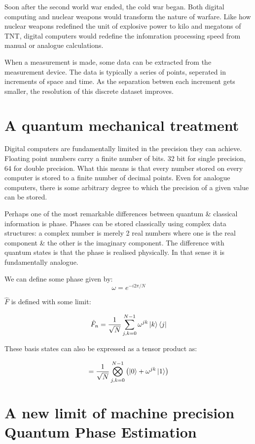 \documentclass{book}
\begin{document}
Soon after the second world war ended, the cold war began. Both digital computing and nuclear weapons would transform the nature of warfare. Like how nuclear weapons redefined the unit of explosive power to kilo and megatons of TNT, digital computers would redefine the infomration processing speed from manual or analogue calculations. 


When a measurement is made, some data can be extracted from the measurement device. The data is typically a series of points, seperated in increments of space and time. As the separation betwen each increment gets smaller, the resolution of this discrete dataset improves. 


\section{A quantum mechanical treatment}


Digital computers are fundamentally limited in the precision they can achieve. Floating point numbers carry a finite number of bits. 32 bit for single precision, 64 for double precision. What this means is that every number stored on every computer is stored to a finite number of decimal points. Even for analogue computers, there is some arbitrary degree to which the precision of a given value can be stored. 

Perhaps one of the most remarkable differences between quantum \& classical information is phase. Phases can be stored classically using complex data structures: a complex number is merely 2 real numbers where one is the real component \& the other is the imaginary component. The difference with quantum states is that the phase is realised physically. In that sense it is fundamentally analogue. 

We can define some phase given by:
$$ \omega = e^{-i2\pi /N} $$

$\hat{F}$ is defined with some limit:

$$\hat{F}_n =  \frac{1}{\sqrt{N}} \sum_{j,k = 0}^{N-1}\omega^{jk} \ket{k}\bra{j} $$

These basis states can also be expressed as a tensor product as: 

$$ = \frac{1}{\sqrt{N}}\bigotimes_{j,k = 0}^{N-1}\left(\ket{0} + \omega^{jk}\ket{1} \right)$$


\section{A new limit of machine precision Quantum Phase Estimation}
\end{document}

